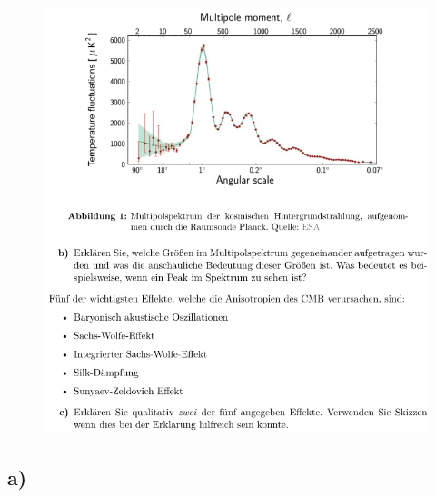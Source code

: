     \begin{figure}[H]
        \centering
        \includegraphics[width=\textwidth]{images/Aufgabe17b.jpg}
        \label{fig:4}
    \end{figure}

\subsection{a)}

